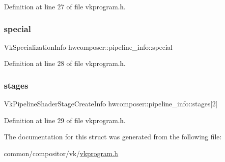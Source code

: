 Definition at line 27 of file vkprogram.\+h.

\mbox{\label{structhwcomposer_1_1pipeline__info_a9bbc979fea6d45dc600939ec3910ec95}} 
\subsubsection{\texorpdfstring{special}{special}}
{\footnotesize\ttfamily Vk\+Specialization\+Info hwcomposer\+::pipeline\+\_\+info\+::special}



Definition at line 28 of file vkprogram.\+h.

\mbox{\label{structhwcomposer_1_1pipeline__info_aaf30bba5a055280571202ca326553b39}} 
\subsubsection{\texorpdfstring{stages}{stages}}
{\footnotesize\ttfamily Vk\+Pipeline\+Shader\+Stage\+Create\+Info hwcomposer\+::pipeline\+\_\+info\+::stages\mbox{[}2\mbox{]}}



Definition at line 29 of file vkprogram.\+h.



The documentation for this struct was generated from the following file\+:\begin{DoxyCompactItemize}
\item 
common/compositor/vk/\mbox{\hyperlink{vkprogram_8h}{vkprogram.\+h}}\end{DoxyCompactItemize}
